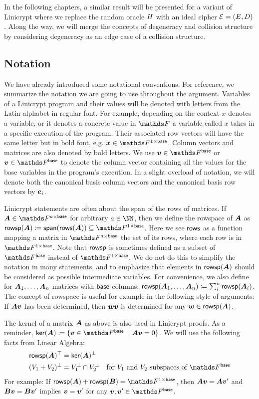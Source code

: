 In the following chapters, a similar result will be presented for a variant of Linicrypt
where we replace the random oracle $H$ with an ideal cipher $\mathcal{E}=(E, D)$.
Along the way,
we will merge the concepts of degeneracy and collision structure by considering degeneracy as an edge case of a collision structure.

\subsection{Notation}
We have already introduced some notational conventions.
For reference, we summarize the notation we are going to use throughout the argument.
Variables of a Linicrypt program and their values will be denoted with letters from the Latin alphabet in regular font.
For example, depending on the context $x$ denotes a variable, or it denotes a concrete value in $\F$ a variable called $x$ takes in a specific execution of the program.
Their associated row vectors will have the same letter but in bold font, e.g. $\vx \in \Frowsp$.
Column vectors and matrices are also denoted by bold letters.
We use $\vbase \in \Fsp$ or $\vv \in \Fsp$ to denote the column vector containing all the values for the base variables in the program's execution.
In a slight overload of notation,
we will denote both the canonical basis column vectors and the canonical basis row vectors by $\boldsymbol e_i$.

Linicrypt statements are often about the span of the rows of matrices.
If $\v A \in \F^{a\times\base}$ for arbitrary $a \in \NN$,
then we define the rowspace of $\boldsymbol A$ as $\rowsp(\v A) \coloneqq \spn(\rows(\v A)) \subseteq \Frowsp$.
Here we see $\mathsf{rows}$ as a function mapping a matrix in $\F^{a\times\base}$ the set of its rows, where each row is in $\Frowsp$.
Note that $\mathsf{rowsp}$ is sometimes defined as a subset of $\Fsp$ instead of $\Frowsp$.
We do not do this to simplify the notation in many statements,
and to emphasize that elements in $\mathsf{rowsp}(\boldsymbol A)$ should be considered as possible intermediate variables.
For convenience, we also define for $\boldsymbol A_1, \dots, \boldsymbol A_{n}$ matrices with $\mathsf{base}$ columns: $\mathsf{rowsp}(\boldsymbol A_1, \dots, \boldsymbol A_{n}) \coloneqq \sum_i^n \mathsf{rowsp}(\boldsymbol A_i)$.
The concept of rowspace is useful for example in the following style of arguments:
If $\boldsymbol A\boldsymbol v$ has been determined, then $\boldsymbol w\boldsymbol v$ is determined for any $\boldsymbol w \in \mathsf{rowsp}(\boldsymbol A)$.

The kernel of a matrix $\boldsymbol A$ as above is also used in Linicrypt proofs.
As a reminder, $\ker(\v A) \coloneqq \{ \vv \in \Fsp\ \mid \v A \vv = 0\}$.
We will use the following facts from Linear Algebra:
\begin{align*}
  \rowsp(\v A)^\top &= \ker(\v A)^\perp \\
  (V_1 + V_2)^\perp &= V_1^\perp \cap V_2^\perp \quad \textrm{for $V_1$ and $V_2$ subspaces of $\Fsp$}
\end{align*}
For example:
If $\rowsp(\v A) + \rowsp(\v B) = \Frowsp$,
then $\boldsymbol A \boldsymbol v = \boldsymbol A \boldsymbol v'$ and $\boldsymbol B \boldsymbol v = \boldsymbol B \boldsymbol v'$ implies $\boldsymbol v = \boldsymbol v'$ for any $\vv, \vv' \in \Fsp$.

